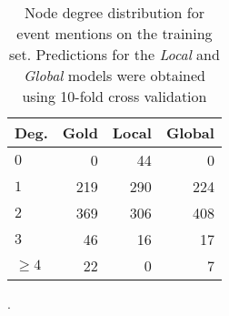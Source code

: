 \begin{table}[t]
{\footnotesize
\hfill{}
\begin{tabular}{|l|r|r|r|}
\hline
\textbf{Deg.} &\textbf{Gold}&\textbf{Local} & \textbf{Global}\\
\hline
$0$            &     0        &    44       &   0 \\ 
$1$            &     219        &    290       & 224  \\ 
$2$            &     369        &    306       &  408  \\ 
$3$            &     46        &     16      &  17 \\ 
$\geq4$           &     22        &     0      &  7 \\
\hline
\end{tabular}}
\hfill{}
\caption{Node degree distribution for event mentions on the training set. Predictions for the \emph{Local} and \emph{Global} models were obtained using 10-fold cross validation}.
\label{tab:degree}
\end{table}





















